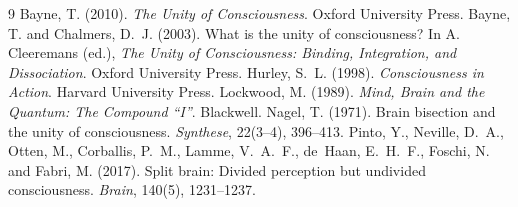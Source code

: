 \documentclass{situationist-preprint}
\begin{document}
\begin{thebibliography}{9}\small
{} Bayne, T. (2010). \emph{The Unity of Consciousness}. Oxford University Press.
 Bayne, T. and Chalmers, D.~J. (2003). What is the unity of consciousness? In A. Cleeremans (ed.), \emph{The Unity of Consciousness: Binding, Integration, and Dissociation}. Oxford University Press.
 Hurley, S.~L. (1998). \emph{Consciousness in Action}. Harvard University Press.
 Lockwood, M. (1989). \emph{Mind, Brain and the Quantum: The Compound \enquote{I}}. Blackwell.
 Nagel, T. (1971). Brain bisection and the unity of consciousness. \emph{Synthese}, 22(3--4), 396--413.
 Pinto, Y., Neville, D.~A., Otten, M., Corballis, P.~M., Lamme, V.~A.~F., de~Haan, E.~H.~F., Foschi, N. and Fabri, M. (2017). Split brain: Divided perception but undivided consciousness. \emph{Brain}, 140(5), 1231--1237.
\end{thebibliography}
\end{document}
